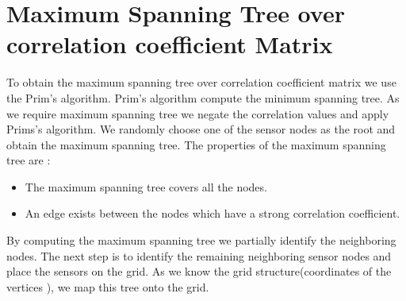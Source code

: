 \section{Maximum Spanning Tree over correlation coefficient Matrix}
To obtain the maximum spanning tree over correlation coefficient matrix we use the Prim's algorithm\cite{BLTJ:BLTJ1515}. Prim's algorithm compute the minimum spanning tree. As we require maximum spanning tree we negate the correlation values and apply Prims's algorithm. We randomly choose one of the sensor nodes as the root and obtain the maximum spanning tree. The properties of the maximum spanning tree are :
\begin{itemize}
\item The maximum spanning tree covers all the nodes.
\item An edge exists between the nodes which have a strong correlation coefficient.
\end{itemize}
By computing the maximum spanning tree we partially identify the neighboring nodes. The next step is to identify the remaining neighboring sensor nodes and place the sensors on the grid. As we know the grid structure(coordinates of the vertices ), we map this tree onto the grid. 

\begin{figure}%

\raggedright
{}%
\quad
\begingroup
{}
\centering
{}
\endgroup
\label{fig:gridTree}
\end{figure}




